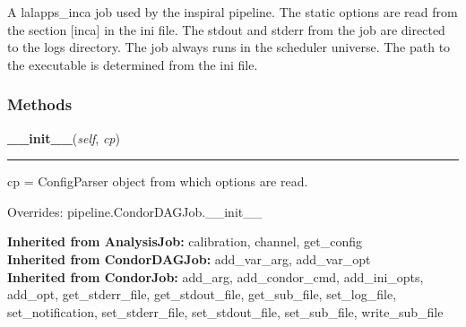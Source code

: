 A lalapps\_inca job used by the inspiral pipeline. The static options are 
read from the section [inca] in the ini file. The stdout and stderr from 
the job are directed to the logs directory. The job always runs in the 
scheduler universe. The path to the executable is determined from the ini 
file.



  \subsubsection{Methods}

    \label{inspiral:IncaJob:__init__}
    \vspace{0.5ex}

    \noindent\begin{boxedminipage}{\textwidth}

    \raggedright \textbf{\_\_init\_\_}(\textit{self}, \textit{cp})

    \vspace{-1.5ex}

    \rule{\textwidth}{0.5\fboxrule}
    cp = ConfigParser object from which options are read.

    \vspace{1ex}

      Overrides: pipeline.CondorDAGJob.\_\_init\_\_

    \end{boxedminipage}

  \noindent\textbf{Inherited from AnalysisJob:}
    calibration,
    channel,
    get\_config
    \\
  \noindent\textbf{Inherited from CondorDAGJob:}
    add\_var\_arg,
    add\_var\_opt
    \\
  \noindent\textbf{Inherited from CondorJob:}
    add\_arg,
    add\_condor\_cmd,
    add\_ini\_opts,
    add\_opt,
    get\_stderr\_file,
    get\_stdout\_file,
    get\_sub\_file,
    set\_log\_file,
    set\_notification,
    set\_stderr\_file,
    set\_stdout\_file,
    set\_sub\_file,
    write\_sub\_file

